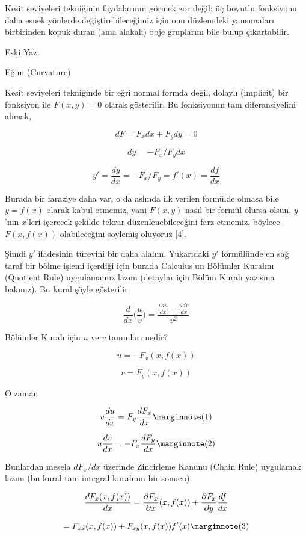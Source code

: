 \documentclass[12pt,fleqn]{article}\usepackage{../../common}
\begin{document}
Kesit seviyeleri tekniğinin faydalarının görmek zor değil; üç boyutlu fonksiyonu
daha esnek yönlerde değiştirebileceğimiz için onu düzlemdeki yansımaları
birbirinden kopuk duran (ama alakalı) obje gruplarını bile bulup çıkartabilir.


\newpage

Eski Yazı

Eğim (Curvature)

Kesit seviyeleri tekniğinde bir eğri normal formda değil, dolaylı
(implicit) bir fonksiyon ile $F(x,y) = 0$ olarak gösterilir. Bu fonksiyonun
tam diferansiyelini alırsak,

$$ dF = F_x dx + F_y dy = 0  $$

$$ dy = -F_x / F_y dx  $$

$$ y' = \frac{dy}{dx} = -F_x / F_y = f'(x) = \frac{df}{dx} $$

Burada bir faraziye daha var, o da aslında ilk verilen formülde olmasa bile
$y=f(x)$ olarak kabul etmemiz, yani $F(x,y)$ nasıl bir formül olursa olsun,
$y$'nin $x$'leri içerecek şekilde tekrar düzenlenebileceğini farz etmemiz,
böylece $F(x,f(x))$ olabileceğini söylemiş oluyoruz [4].

Şimdi $y'$ ifadesinin türevini bir daha alalım. Yukarıdaki $y'$ formülünde
en sağ taraf bir bölme işlemi içerdiği için burada Calculus'un Bölümler
Kuralını (Quotient Rule) uygulamamız lazım (detaylar için Bölüm Kuralı
yazısına bakınız). Bu kural şöyle gösterilir:

$$ \frac{d}{dx}\bigg(\frac{u}{v}\bigg) = 
\frac{\displaystyle \frac{v du}{dx} - \frac{u dv}{dx}}{v^2} $$

Bölümler Kuralı için $u$ ve $v$ tanımları nedir? 

$$ u = -F_x(x,f(x))  $$

$$ v = F_y(x,f(x)) $$

O zaman

$$ 
v \frac{du}{dx} = F_y \frac{dF_x}{dx} 
\mlabel{1}
$$

$$
u \frac{dv}{dx} = -F_x \frac{dF_y }{dx} 
\mlabel{2}
$$

Bunlardan mesela $dF_x/dx$ üzerinde Zincirleme Kanunu (Chain Rule) uygulamak
lazım (bu kural tam integral kuralının bir sonucu). 

$$ \frac{d F_x(x,f(x)) }{dx} = \frac{\partial F_x}{\partial  x}(x,f(x))+\frac{\partial F_x}{\partial y}\frac{df}{dx}\\ $$

$$
= F_{xx}(x,f(x))+F_{xy}(x,f(x))f'(x) 
\mlabel{3}
$$
\end{document}
